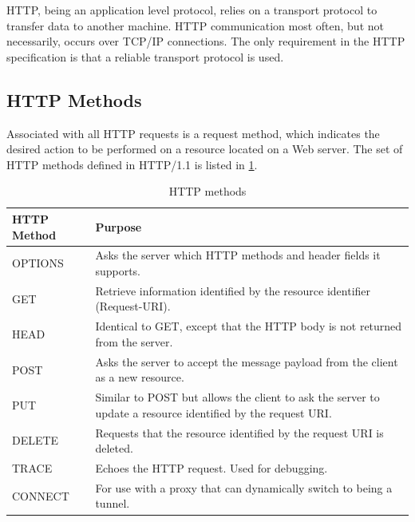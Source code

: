 HTTP, being an application level protocol, relies on a transport protocol to
transfer data to another machine. HTTP communication most often, but not
necessarily, occurs over TCP/IP connections. The only requirement in the HTTP
specification is that a reliable transport protocol is used.

\subsection{HTTP Methods}

 Associated with all HTTP requests is a request method, which indicates the
 desired action to be performed on a resource located on a Web server. The set
 of HTTP methods defined in HTTP/1.1 is listed in \cref{table-http-methods}.

 \begin{table}[h]
 \begin{tabularx}{\textwidth}{| X | X |}
 \hline
   \textbf{HTTP Method} & \textbf{Purpose} \\ \hline
   OPTIONS & Asks the server which HTTP methods and header fields it supports. \\ \hline
   GET & Retrieve information identified by the resource identifier (Request-URI). \\ \hline
   HEAD & Identical to GET, except that the HTTP body is not returned from the server. \\ \hline
   POST & Asks the server to accept the message payload from the client as a new resource.\\ \hline
   PUT & Similar to POST but allows the client to ask the server to update a resource identified by the request URI. \\ \hline
   DELETE & Requests that the resource identified by the request URI is deleted. \\ \hline
   TRACE & Echoes the HTTP request. Used for debugging. \\ \hline
   CONNECT & For use with a proxy that can dynamically switch to being a tunnel.\\ \hline
 \end{tabularx}
 \caption{HTTP methods}
 \label{table-http-methods}
 \end{table}

\section{}
\label{tcp}

